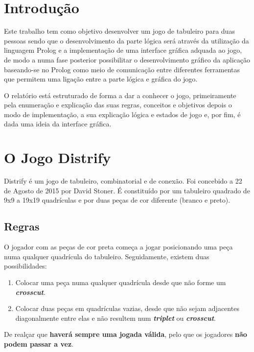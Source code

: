 \documentclass[a4paper]{article}
\begin{document}
\newpage

\section{Introdução}

Este trabalho tem como objetivo desenvolver um jogo de tabuleiro para duas pessoas sendo que o desenvolvimento da parte lógica será através da utilização da linguagem Prolog e a implementação de uma interface gráfica adquada ao jogo, de modo a numa fase posterior possibilitar o desenvolvimento gráfico da aplicação baseando-se no Prolog como meio de comunicação entre diferentes ferramentas que permitem uma ligação entre a parte lógica e gráfica do jogo.

O relatório está estruturado de forma a dar a conhecer o jogo, primeiramente pela enumeração e explicação das suas regras, conceitos e objetivos depois o modo de implementação, a sua explicação lógica e estados de jogo e, por fim, é dada uma ideia da interface gráfica.

\section{O Jogo Distrify}

Distrify é um jogo de tabuleiro, combinatorial e de conexão. Foi concebido a 22 de Agosto de 2015 por David Stoner.
É constituído por um tabuleiro quadrado de 9x9 a 19x19 quadrículas e por duas peças de cor diferente (branco e preto).
\subsection*{Regras}
O jogador com as peças de cor preta começa a jogar posicionando uma peça numa qualquer quadrícula do tabuleiro. Seguidamente, existem duas possibilidades:
\begin{enumerate}
\item Colocar uma peça numa qualquer quadrícula desde que não forme um \textit{\textbf{crosscut}}.
\item Colocar duas peças em quadrículas vazias, desde que não sejam adjacentes diagonalmente entre elas e não resultem num \textit{\textbf{triplet}} ou \textit{\textbf{crosscut}}.
\end{enumerate}
De realçar que \textbf{haverá sempre uma jogada válida}, pelo que os jogadores \textbf{não podem passar a vez}.
\end{document}
